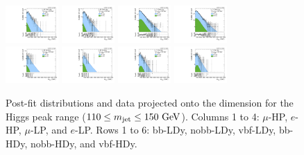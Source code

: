 \begin{figure}[htbp]
  \includegraphics[width=0.18\textwidth]{fig/fitValidation/PostFit_SR_MVV_MJJ110to150__mu_HP_nobb_HDy_Run2.pdf}
  \includegraphics[width=0.18\textwidth]{fig/fitValidation/PostFit_SR_MVV_MJJ110to150__e_HP_nobb_HDy_Run2.pdf}
  \includegraphics[width=0.18\textwidth]{fig/fitValidation/PostFit_SR_MVV_MJJ110to150__mu_LP_nobb_HDy_Run2.pdf}
  \includegraphics[width=0.18\textwidth]{fig/fitValidation/PostFit_SR_MVV_MJJ110to150__e_LP_nobb_HDy_Run2.pdf}\\
  \includegraphics[width=0.18\textwidth]{fig/fitValidation/PostFit_SR_MVV_MJJ110to150__mu_HP_vbf_HDy_Run2.pdf}
  \includegraphics[width=0.18\textwidth]{fig/fitValidation/PostFit_SR_MVV_MJJ110to150__e_HP_vbf_HDy_Run2.pdf}
  \includegraphics[width=0.18\textwidth]{fig/fitValidation/PostFit_SR_MVV_MJJ110to150__mu_LP_vbf_HDy_Run2.pdf}
  \includegraphics[width=0.18\textwidth]{fig/fitValidation/PostFit_SR_MVV_MJJ110to150__e_LP_vbf_HDy_Run2.pdf}\\
  \caption{
    Post-fit distributions and data projected onto the \MVV dimension for the Higgs peak range ($110\leq\MJ\leq150\unit{GeV}$).
    Columns 1 to 4: $\mu$-HP, $e$-HP, $\mu$-LP, and $e$-LP.
    Rows 1 to 6: bb-LDy, nobb-LDy, vbf-LDy, bb-HDy, nobb-HDy, and vbf-HDy.
  }
  \label{fig:postfit_MVV_MJJ110to150_Run2}
\end{figure}

